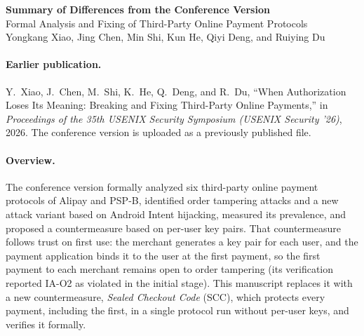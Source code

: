 \documentclass[11pt]{article}
\begin{document}
\begin{center}
{\Large\bfseries Summary of Differences from the Conference Version}\\[6pt]
Formal Analysis and Fixing of Third-Party Online Payment Protocols\\
Yongkang Xiao, Jing Chen, Min Shi, Kun He, Qiyi Deng, and Ruiying Du
\end{center}

\paragraph{Earlier publication.}
Y.~Xiao, J.~Chen, M.~Shi, K.~He, Q.~Deng, and R.~Du,
``When Authorization Loses Its Meaning: Breaking and Fixing Third-Party Online Payments,''
in \emph{Proceedings of the 35th USENIX Security Symposium (USENIX Security '26)}, 2026.
The conference version is uploaded as a previously published file.

\paragraph{Overview.}
The conference version formally analyzed six third-party online payment protocols of Alipay and PSP-B, identified order tampering attacks and a new attack variant based on Android Intent hijacking, measured its prevalence, and proposed a countermeasure based on per-user key pairs.
That countermeasure follows trust on first use: the merchant generates a key pair for each user, and the payment application binds it to the user at the first payment, so the first payment to each merchant remains open to order tampering (its verification reported IA-O2 as violated in the initial stage).
This manuscript replaces it with a new countermeasure, \emph{Sealed Checkout Code} (SCC), which protects every payment, including the first, in a single protocol run without per-user keys, and verifies it formally.
\end{document}
